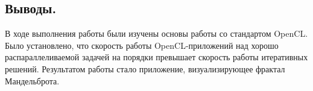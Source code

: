 \subsection*{Выводы.}
В ходе выполнения работы были изучены основы работы со стандартом OpenCL. Было установлено, что скорость работы OpenCL-приложений над хорошо распараллеливаемой задачей на порядки превышает скорость работы итеративных решений. Результатом работы стало приложение, визуализирующее фрактал Мандельброта.




